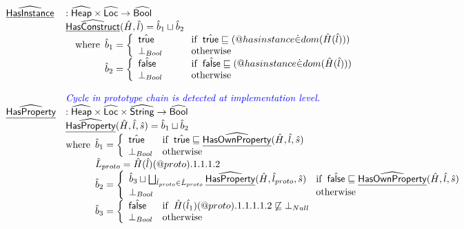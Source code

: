 \[\begin{array}{ll}
\ahf{HasInstance} & : \aHeap \times \aLoc \rightarrow \abs{Bool} \\
& \ahf{HasConstruct}(\hat{H},\hat{l})
  = \hat{b}_1\sqcup\hat{b}_2 \\
& \quad\wherec{
  \hat{b}_1 = 
    \left\{
      \begin{array}{l@{\quad\quad\quad}l}
        \atrue &\ifc{\atrue\sqsubseteq(\varprop{hasinstance} \dot{\in} dom(\hat{H}(\hat{l})))}\\
        \bot_{Bool} &\owc
      \end{array}
    \right.\\
  \hat{b}_2 = 
    \left\{
      \begin{array}{l@{\quad\quad\quad}l}
        \afalse &\ifc{\afalse\sqsubseteq(\varprop{hasinstance} \dot{\in} dom(\hat{H}(\hat{l})))}\\
        \bot_{Bool} &\owc
      \end{array}
    \right.\\
  }
\\\\

& {\inblue \textit{Cycle in prototype chain is detected at implementation level.}} \\
\ahf{HasProperty} & : \aHeap \times \aLoc \times \abs{String} \rightarrow \abs{Bool} \\
& \ahf{HasProperty}(\hat{H},\hat{l},\hat{s}) = \hat{b}_1\sqcup\hat{b}_2 \\
& \wherec{
  \hat{b}_1 = \left\{
    \begin{array}{ll}
      \atrue & \ifc{\atrue\sqsubseteq\ahf{HasOwnProperty}(\hat{H},\hat{l},\hat{s})} \\
      \bot_{Bool} & \owc \\
    \end{array}
    \right.\\
    \hat{L}_{proto} = \hat{H}(\hat{l})(\varprop{proto}).1.1.1.2 \\
  \hat{b}_2 = \left\{
    \begin{array}{ll}
      \hat{b}_3 \sqcup \bigsqcup_{\hat{l}_{proto}\in\hat{L}_{proto}}\ahf{HasProperty}(\hat{H},\hat{l}_{proto},\hat{s})
      & \ifc{\afalse\sqsubseteq\ahf{HasOwnProperty}(\hat{H},\hat{l},\hat{s})} \\
      \bot_{Bool} & \owc \\
    \end{array}
    \right.\\
    \hat{b}_3 =
    \left\{
      \begin{array}{ll}
        \afalse & \ifc{\hat{H}(\hat{l}_1)(\varprop{proto}).1.1.1.1.2 \not\sqsubseteq \bot_{Null}}\\
        \bot_{Bool} & \owc\\
      \end{array}
    \right.\\
  }\\
\\


\end{array}\]
